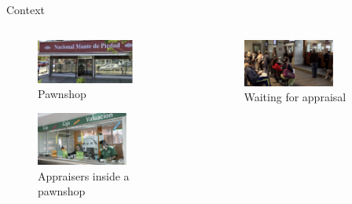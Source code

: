 \documentclass[9pt, aspectratio=169]{beamer}
\begin{document}
\begin{frame}{Context}
\vspace{-.4in}
\begin{columns}
\begin{column}{.45\textwidth}
\begin{figure}[H]
    \begin{center}
    \caption{Pawnshop}
        \includegraphics[width=0.75\textwidth]{Figuras/empenio2_.png}
    \end{center}
    \end{figure}
\begin{figure}[H]
    \begin{center}
    \caption{Appraisers  inside a pawnshop}
        \includegraphics[width=0.7\textwidth]{Figuras/empenio9_.png}
    \end{center}
    \end{figure}    
    \end{column}
\begin{column}{.45\textwidth}
\begin{figure}[H]
    \begin{center}
    \caption{Waiting for appraisal}
        \includegraphics[width=0.7\textwidth]{Figuras/empenio11_.png}

\end{center}
\end{figure}
\end{column}
\end{columns}
\end{frame}
\end{document}

